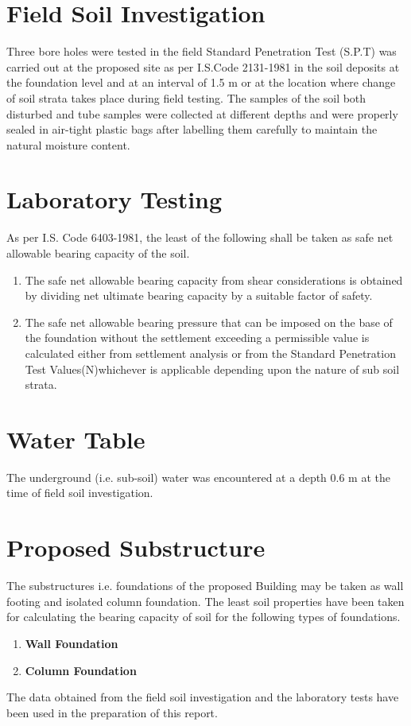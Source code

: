\documentclass{soil12}
\begin{document}
\section{Field Soil Investigation}
Three bore holes were tested in the field Standard Penetration Test (S.P.T) was carried out at the proposed
site as per I.S.Code 2131-1981 in the soil deposits at the foundation level and at an interval of 1.5 m or at
the location where change of soil strata takes place during field testing. The samples of the soil both
disturbed and tube samples were collected at different depths and were properly sealed in air-tight plastic
bags after labelling them carefully to maintain the natural moisture content.
\section{Laboratory Testing}
As per I.S. Code 6403-1981, the least of the following shall be taken as safe net allowable bearing
capacity of the soil.
\begin{enumerate}
\item{The safe net allowable bearing capacity from shear considerations is obtained by dividing net
ultimate bearing capacity by a suitable factor of safety.}
\item{The safe net allowable bearing pressure that can be imposed on the base of the foundation
without the settlement exceeding a permissible value is calculated either from settlement
analysis or from the Standard Penetration Test Values(N)whichever is applicable depending
upon the nature of sub soil strata.}
\end{enumerate}
\section{Water Table}
The underground (i.e. sub-soil) water was encountered at a depth 0.6 m at the time of field soil
investigation.
\section{Proposed Substructure}
The substructures i.e. foundations of the proposed Building may be taken as wall footing and isolated
column foundation. The least soil properties have been taken for calculating the bearing capacity of
soil for the following types of foundations.
\begin{enumerate}
\item{\large{\textbf{Wall Foundation}}}\\
\item{\large{\textbf{Column Foundation}}}\\
\end{enumerate}
The data obtained from the field soil investigation and the laboratory tests have been used in the
preparation of this report.
\end{document}
